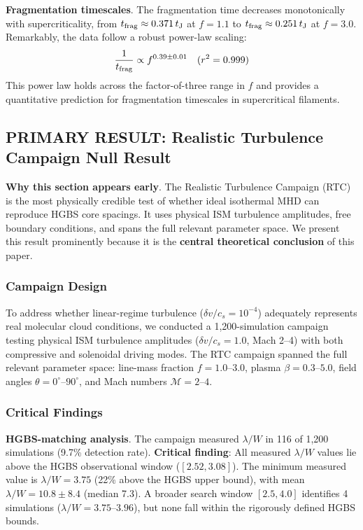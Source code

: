 \documentclass[twocolumn]{mnras}
\begin{document}
\textbf{Fragmentation timescales}. The fragmentation time decreases monotonically with supercriticality, from $t_{\rm frag} \approx 0.371\,t_{\rm J}$ at $f = 1.1$ to $t_{\rm frag} \approx 0.251\,t_{\rm J}$ at $f = 3.0$. Remarkably, the data follow a robust power-law scaling:
\begin{equation}
\frac{1}{t_{\rm frag}} \propto f^{0.39 \pm 0.01} \quad (r^2 = 0.999)
\end{equation}
This power law holds across the factor-of-three range in $f$ and provides a quantitative prediction for fragmentation timescales in supercritical filaments.

\subsection{PRIMARY RESULT: Realistic Turbulence Campaign Null Result}
\label{sec:rtc}

\textbf{Why this section appears early}. The Realistic Turbulence Campaign (RTC) is the most physically credible test of whether ideal isothermal MHD can reproduce HGBS core spacings. It uses physical ISM turbulence amplitudes, free boundary conditions, and spans the full relevant parameter space. We present this result prominently because it is the \textbf{central theoretical conclusion} of this paper.

\subsubsection{Campaign Design}

To address whether linear-regime turbulence ($\delta v/c_s = 10^{-4}$) adequately represents real molecular cloud conditions, we conducted a 1,200-simulation campaign testing physical ISM turbulence amplitudes ($\delta v/c_s = 1.0$, Mach 2--4) with both compressive and solenoidal driving modes. The RTC campaign spanned the full relevant parameter space: line-mass fraction $f = 1.0$--$3.0$, plasma $\beta = 0.3$--$5.0$, field angles $\theta = 0^{\circ}$--$90^{\circ}$, and Mach numbers $\mathcal{M} = 2$--$4$.

\subsubsection{Critical Findings}

\textbf{HGBS-matching analysis}. The campaign measured $\lambda/W$ in 116 of 1,200 simulations (9.7\% detection rate). \textbf{Critical finding}: All measured $\lambda/W$ values lie above the HGBS observational window ($[2.52, 3.08]$). The minimum measured value is $\lambda/W = 3.75$ (22\% above the HGBS upper bound), with mean $\lambda/W = 10.8 \pm 8.4$ (median 7.3). A broader search window $[2.5, 4.0]$ identifies 4 simulations ($\lambda/W = 3.75$--$3.96$), but none fall within the rigorously defined HGBS bounds.
\end{document}
